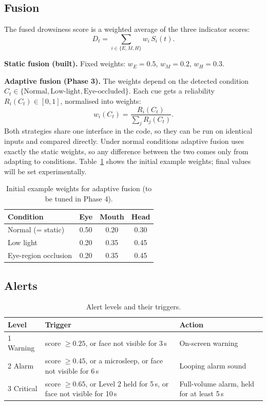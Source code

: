 \documentclass[12pt,a4paper]{article}
\begin{document}
\subsection{Fusion}
The fused drowsiness score is a weighted average of the three indicator scores:
\begin{equation}
D_t = \sum_{i \in \{E, M, H\}} w_i \, S_i(t).
\end{equation}

\medskip\noindent\textbf{Static fusion (built).} Fixed weights: $w_E = 0.5$, $w_M = 0.2$, $w_H = 0.3$.

\medskip\noindent\textbf{Adaptive fusion (Phase 3).} The weights depend on the detected condition $C_t \in \{\text{Normal}, \text{Low-light}, \text{Eye-occluded}\}$. Each cue gets a reliability $R_i(C_t) \in [0,1]$, normalised into weights:
\begin{equation}
w_i(C_t) = \frac{R_i(C_t)}{\sum_j R_j(C_t)}.
\end{equation}
Both strategies share one interface in the code, so they can be run on identical inputs and compared directly. Under normal conditions adaptive fusion uses exactly the static weights, so any difference between the two comes only from adapting to conditions. Table~\ref{tab:weights} shows the initial example weights; final values will be set experimentally.

\begin{table}[htbp]
\centering
\caption{Initial example weights for adaptive fusion (to be tuned in Phase 4).}
\label{tab:weights}
\begin{tabular}{lccc}
\toprule
Condition & Eye & Mouth & Head \\
\midrule
Normal (= static) & 0.50 & 0.20 & 0.30 \\
Low light & 0.20 & 0.35 & 0.45 \\
Eye-region occlusion & 0.20 & 0.35 & 0.45 \\
\bottomrule
\end{tabular}
\end{table}

\subsection{Alerts}

\begin{table}[H]
\centering
\caption{Alert levels and their triggers.}
\label{tab:alerts}
\begin{tabularx}{\textwidth}{lXX}
\toprule
Level & Trigger & Action \\
\midrule
1 Warning & score $\ge 0.25$, or face not visible for 3\,s & On-screen warning \\
2 Alarm & score $\ge 0.45$, or a microsleep, or face not visible for 6\,s & Looping alarm sound \\
3 Critical & score $\ge 0.65$, or Level 2 held for 5\,s, or face not visible for 10\,s & Full-volume alarm, held for at least 5\,s \\
\bottomrule
\end{tabularx}
\end{table}
\end{document}
